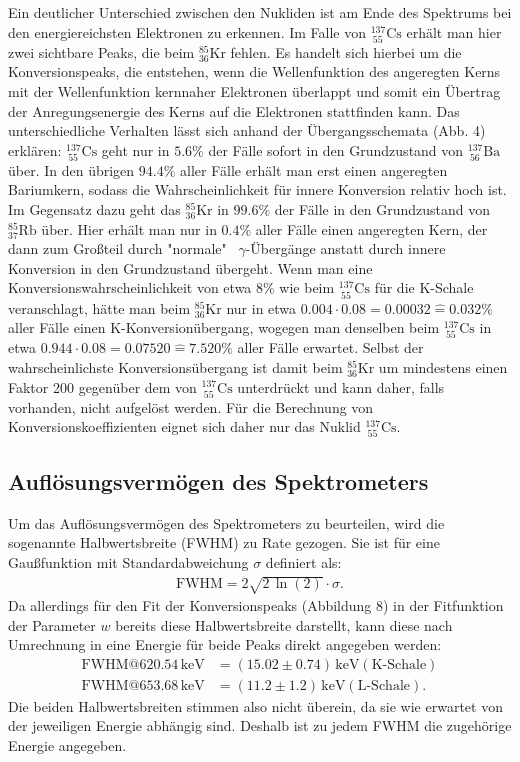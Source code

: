 \documentclass[german,  %
parskip=full,  %
]{scrartcl}
\begin{document}
Ein deutlicher Unterschied zwischen den Nukliden ist am Ende des Spektrums bei den energiereichsten Elektronen zu erkennen. Im Falle von \(^{137}_{\ 55}\mathrm{Cs}\) erhält man hier zwei sichtbare Peaks, die beim \(^{85}_{ 36}\mathrm{Kr}\) fehlen. Es handelt sich hierbei um die Konversionspeaks, die entstehen, wenn die Wellenfunktion des angeregten Kerns mit der Wellenfunktion kernnaher Elektronen überlappt und somit ein Übertrag der Anregungsenergie des Kerns auf die Elektronen stattfinden kann. Das unterschiedliche Verhalten lässt sich anhand der Übergangsschemata (Abb. 4) erklären: \(^{137}_{\ 55}\mathrm{Cs}\) geht nur in \(5.6\%\) der Fälle sofort in den Grundzustand von \(^{137}_{\ 56}\mathrm{Ba}\) über. In den übrigen \(94.4\%\) aller Fälle erhält man erst einen angeregten Bariumkern, sodass die Wahrscheinlichkeit für innere Konversion relativ hoch ist. Im Gegensatz dazu geht das \(^{85}_{36}\mathrm{Kr}\) in \(99.6\%\) der Fälle in den Grundzustand von \(^{85}_{37}\mathrm{Rb}\) über. Hier erhält man nur in \(0.4\%\) aller Fälle einen angeregten Kern, der dann zum Großteil durch "normale" \ \(\gamma\)-Übergänge anstatt durch innere Konversion in den Grundzustand übergeht. Wenn man eine Konversionswahrscheinlichkeit von etwa \(8\%\) wie beim \(^{137}_{\ 55}\mathrm{Cs}\) für die K-Schale veranschlagt, hätte man beim \(^{85}_{ 36}\mathrm{Kr}\) nur in etwa \(0.004\cdot 0.08 = 0.00032 \hat{=} 0.032\%\) aller Fälle einen K-Konversionübergang, wogegen man denselben beim \(^{137}_{\ 55}\mathrm{Cs}\) in etwa \(0.944\cdot 0.08 = 0.07520 \hat{=} 7.520\%\) aller Fälle erwartet. Selbst der wahrscheinlichste Konversionsübergang ist damit beim \(^{85}_{ 36}\mathrm{Kr}\) um mindestens einen Faktor 200 gegenüber dem von \(^{137}_{\ 55}\mathrm{Cs}\) unterdrückt und kann daher, falls vorhanden, nicht aufgelöst werden. Für die Berechnung von Konversionskoeffizienten eignet sich daher nur das Nuklid \(^{137}_{\ 55}\mathrm{Cs}\). 

\subsection{Auflösungsvermögen des Spektrometers}
Um das Auflösungsvermögen des Spektrometers zu beurteilen, wird die sogenannte Halbwertsbreite (FWHM) zu Rate gezogen. Sie ist für eine Gaußfunktion mit Standardabweichung $\sigma$ definiert als:
\begin{align*}
\text{FWHM} = 2\sqrt{2 \, \ln(2)} \cdot \sigma.
\end{align*}
Da allerdings für den Fit der Konversionspeaks (Abbildung 8) in der Fitfunktion der Parameter $w$ bereits diese Halbwertsbreite darstellt, kann diese nach Umrechnung in eine Energie für beide Peaks direkt angegeben werden:
\begin{align*}
\text{FWHM}@620.54\,\mathrm{keV} &= (15.02 \pm 0.74)\,\mathrm{keV} (\text{K-Schale}) \\
\text{FWHM}@653.68\,\mathrm{keV} &= (11.2 \pm 1.2)\,\mathrm{keV} (\text{L-Schale}) .
\end{align*}
Die beiden Halbwertsbreiten stimmen also nicht überein, da sie wie erwartet von der jeweiligen Energie abhängig sind. Deshalb ist zu jedem FWHM die zugehörige Energie angegeben.
\end{document}

